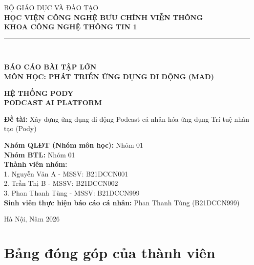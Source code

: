 \documentclass[12pt,a4paper]{report}
\begin{document}
\begin{titlepage}
\begin{center}
    \large BỘ GIÁO DỤC VÀ ĐÀO TẠO \\
    \large \textbf{HỌC VIỆN CÔNG NGHỆ BƯU CHÍNH VIỄN THÔNG} \\
    \large \textbf{KHOA CÔNG NGHỆ THÔNG TIN 1} \\
    \vspace{1cm}
    \rule{5cm}{0.4pt} \\
    \vspace{2cm}
    
    \Large \textbf{BÁO CÁO BÀI TẬP LỚN} \\
    \Large \textbf{MÔN HỌC: PHÁT TRIỂN ỨNG DỤNG DI ĐỘNG (MAD)} \\
    \vspace{1.5cm}
    
    \Huge \textbf{HỆ THỐNG PODY} \\
    \Huge \textbf{PODCAST AI PLATFORM} \\
    \vspace{2cm}
    
    \large \textbf{Đề tài:} Xây dựng ứng dụng di động Podcast cá nhân hóa ứng dụng Trí tuệ nhân tạo (Pody) \\
    \vspace{3cm}
    
    \begin{flushleft}
    \large \textbf{Nhóm QLĐT (Nhóm môn học):} Nhóm 01 \\
    \large \textbf{Nhóm BTL:} Nhóm 01 \\
    \large \textbf{Thành viên nhóm:} \\
    1. Nguyễn Văn A - MSSV: B21DCCN001 \\
    2. Trần Thị B - MSSV: B21DCCN002 \\
    3. Phan Thanh Tùng - MSSV: B21DCCN999 \\
    \vspace{0.5cm}
    \large \textbf{Sinh viên thực hiện báo cáo cá nhân:} Phan Thanh Tùng (B21DCCN999)
    \end{flushleft}
    
    \vfill
    \large Hà Nội, Năm 2026
\end{center}
\end{titlepage}

\newpage
\chapter*{Bảng đóng góp của thành viên}
\end{document}
